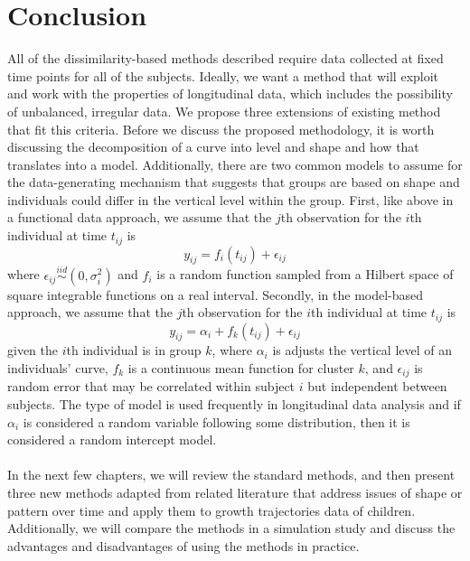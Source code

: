 \section{Conclusion}
All of the dissimilarity-based methods described require data collected at fixed time points for all of the subjects. Ideally, we want a method that will exploit and work with the properties of longitudinal data, which includes the possibility of unbalanced, irregular data. We propose three extensions of existing method that fit this criteria. Before we discuss the proposed methodology, it is worth discussing the decomposition of a curve into level and shape and how that translates into a model. Additionally,  there are two common models to assume for the data-generating mechanism that suggests that groups are based on shape and individuals could differ in the vertical level within the group. First, like above in a functional data approach, we assume that the $j$th observation for the $i$th individual at time $t_{ij}$ is
$$y_{ij}= f_i(t_{ij})+\epsilon_{ij}$$
where $\epsilon_{ij}\overset{iid}{\sim} (0,\sigma_{i}^{2})$ and $f_{i}$ is a random function sampled from a Hilbert space of square integrable functions on a real interval. Secondly, in the model-based approach, we assume that the $j$th observation for the $i$th individual at time $t_{ij}$ is
$$y_{ij}=\alpha_i+f_k(t_{ij})+\epsilon_{ij}$$
given the $i$th individual is in group $k$, where $\alpha_i$ is adjusts the vertical level of an individuals' curve, $f_k$ is a continuous mean function for cluster $k$, and $\epsilon_{ij}$ is random error that may be correlated within subject $i$ but independent between subjects. The type of model is used frequently in longitudinal data analysis \cite{diggle2002} and if $\alpha_{i}$ is considered a random variable following some distribution, then it is considered a random intercept model. \\\\
 In the next few chapters, we will review the standard methods, and then present three new methods adapted from related literature that address issues of shape or pattern over time and apply them to growth trajectories data of children. Additionally, we will compare the methods in a simulation study and discuss the advantages and disadvantages of using the methods in practice. 
	
